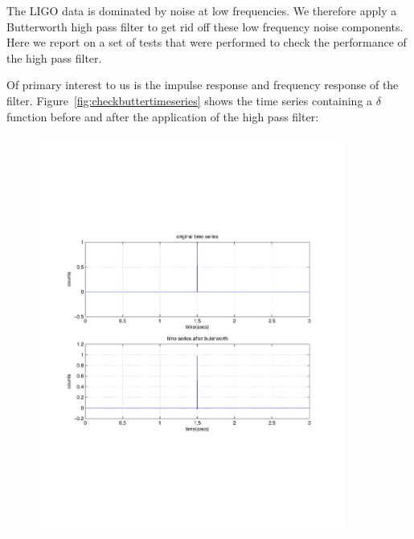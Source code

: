The LIGO data is dominated by noise at low frequencies. We 
therefore apply a Butterworth high pass filter to get rid off these 
low frequency noise components. Here we report on a set of tests 
that were performed to check the performance of the high pass filter.

Of primary interest to us is the impulse response and frequency response 
of the filter. Figure~\ref{fig:checkbuttertimeseries} shows the 
time series containing a $\delta$ function before and after the 
application of the high pass filter:
\begin{figure}[h]
\begin{center}
\includegraphics[width=0.9\textwidth]{figures/checkbuttertimeseries}

\end{center}
\end{figure}
